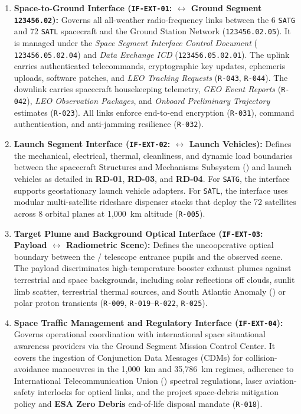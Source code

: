 \begin{enumerate}
    \item \textbf{Space-to-Ground Interface (\texttt{IF-EXT-01}:  $\leftrightarrow$ Ground Segment \texttt{123456.02}):} Governs all all-weather radio-frequency links between the 6 \texttt{SATG} and 72 \texttt{SATL} spacecraft and the Ground Station Network (\texttt{123456.02.05}). It is managed under the \emph{Space Segment Interface Control Document} ( \texttt{123456.05.02.04}) and \emph{Data Exchange ICD} (\texttt{123456.05.02.01}). The uplink carries authenticated telecommands, cryptographic key updates, ephemeris uploads, software patches, and \emph{LEO Tracking Requests} (\texttt{R-043}, \texttt{R-044}). The downlink carries spacecraft housekeeping telemetry, \emph{GEO Event Reports} (\texttt{R-042}), \emph{LEO Observation Packages}, and \emph{Onboard Preliminary Trajectory} estimates (\texttt{R-023}). All links enforce end-to-end encryption (\texttt{R-031}), command authentication, and anti-jamming resilience (\texttt{R-032}).
    \item \textbf{Launch Segment Interface (\texttt{IF-EXT-02}:  $\leftrightarrow$ Launch Vehicles):} Defines the mechanical, electrical, thermal, cleanliness, and dynamic load boundaries between the spacecraft Structures and Mechanisms Subsystem () and launch vehicles as detailed in \textbf{RD-01}, \textbf{RD-03}, and \textbf{RD-04}. For \texttt{SATG}, the interface supports geostationary launch vehicle adapters. For \texttt{SATL}, the interface uses modular multi-satellite rideshare dispenser stacks that deploy the 72  satellites across 8 orbital planes at 1,000~km altitude (\texttt{R-005}).
    \item \textbf{Target Plume and Background Optical Interface (\texttt{IF-EXT-03}:  Payload $\leftrightarrow$ Radiometric Scene):} Defines the uncooperative optical boundary between the / telescope entrance pupils and the observed scene. The payload discriminates high-temperature booster exhaust plumes against terrestrial and space backgrounds, including solar reflections off clouds, sunlit limb scatter, terrestrial thermal sources, and South Atlantic Anomaly () or polar proton transients (\texttt{R-009}, \texttt{R-019}--\texttt{R-022}, \texttt{R-025}).
    \item \textbf{Space Traffic Management and Regulatory Interface (\texttt{IF-EXT-04}):} Governs operational coordination with international space situational awareness providers via the Ground Segment Mission Control Center. It covers the ingestion of Conjunction Data Messages (CDMs) for collision-avoidance manoeuvres in the 1,000~km  and 35,786~km  regimes, adherence to International Telecommunication Union () spectral regulations, laser aviation-safety interlocks for optical links, and the project space-debris mitigation policy and \textbf{ESA Zero Debris} end-of-life disposal mandate (\texttt{R-018}).
\end{enumerate}
